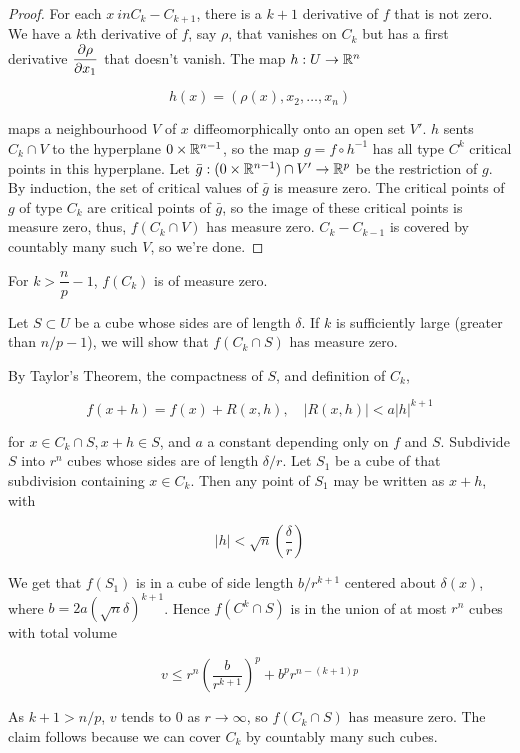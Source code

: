 \begin{proof}
    For each $x\ in C_k - C_{k+1}$, there is a $k+1$ derivative of $f$ that is not zero. We have a $k$th derivative of $f$, say $\rho$, that vanishes on $C_k$ but has a first derivative $\dfrac{\partial \rho}{\partial x_1}$ that doesn't vanish. The map $h: U \to \mathbb{R}^n$

    \[h(x) = (\rho(x),x_2,\ldots, x_n)\]

    maps a neighbourhood $V$ of $x$ diffeomorphically onto an open set $V'$. $h$ sents $C_k \cap V$ to the hyperplane $0 \times \mathbb{R}^{n-1}$, so the map $g = f \circ h^{-1}$ has all type $C^k$ critical points in this hyperplane. Let $\bar{g}: (0 \times \mathbb{R}^{n-1}) \cap V' \to \mathbb{R}^p$ be the restriction of $g$. By induction, the set of critical values of $\bar{g}$ is measure zero. The critical points of $g$ of type $C_k$ are critical points of $\bar{g}$, so the image of these critical points is measure zero, thus, $f(C_k \cap V)$ has measure zero. $C_k - C_{k-1}$ is covered by countably many such $V$, so we're done. 
\end{proof}

\begin{lemma}
    For $k > \dfrac{n}{p} - 1$, $f(C_k)$ is of measure zero. 
\end{lemma}

Let $S \subset U$ be a cube whose sides are of length $\delta$. If $k$ is sufficiently large (greater than $n/p - 1$), we will show that $f(C_k \cap S)$ has measure zero. 

By Taylor's Theorem, the compactness of $S$, and definition of $C_k$, 

\[f(x+h) = f(x) + R(x,h), \quad |R(x,h)| < a|h|^{k+1}\]

for $x \in C_k \cap S, x+h \in S$, and $a$ a constant depending only on $f$ and $S$. Subdivide $S$ into $r^n$ cubes whose sides are of length $\delta/r$. Let $S_1$ be a cube of that subdivision containing $x \in C_k$. Then any point of $S_1$ may be written as $x + h$, with 

\[|h| < \sqrt{n}\left(\frac{\delta}{r}\right)\]

We get that $f(S_1)$ is in a cube of side length $b/r^{k+1}$ centered about $\delta(x)$, where $b = 2a(\sqrt{n}\delta)^{k+1}$. Hence $f(C^k \cap S)$ is in the union of at most $r^n$ cubes with total volume 

\[v \leq r^n\left(\frac{b}{r^{k+1}}\right)^p + b^pr^{n-(k+1)p}\]

As $k+1 > n/p$, $v$ tends to 0 as $r \to \infty$, so $f(C_k \cap S)$ has measure zero. The claim follows because we can cover $C_k$ by countably many such cubes. 

